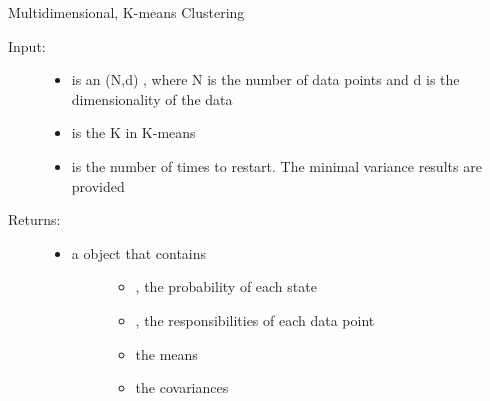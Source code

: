 \documentclass[letterpaper,10pt,english]{sphinxmanual}
\begin{document}

\begin{fulllineitems}
\label{code_utils:utils.clustering.kmeans}
Multidimensional, K-means Clustering
\begin{description}
\item[{Input:}] \leavevmode\begin{itemize}
\item {} 
 is an (N,d) , where N is the number of data points and d is the dimensionality of the data

\item {} 
 is the K in K-means

\item {} 
 is the number of times to restart. The minimal variance results are provided

\end{itemize}

\item[{Returns:}] \leavevmode\begin{itemize}
\item {} \begin{description}
\item[{a  object that contains}] \leavevmode\begin{itemize}
\item {} 
, the probability of each state

\item {} 
, the responsibilities of each data point

\item {} 
 the means

\item {} 
 the covariances

\end{itemize}

\end{description}

\end{itemize}

\end{description}

\end{fulllineitems}
\end{document}
